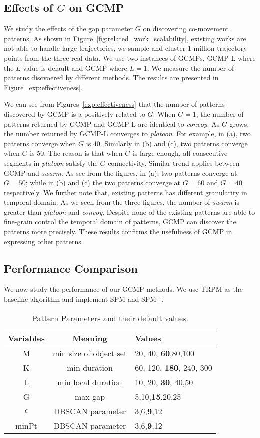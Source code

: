 \subsection{Effects of $G$ on GCMP}
We study the effects of the gap parameter $G$ on discovering co-movement patterns. 
As shown in Figure~\ref{fig:related_work_scalability},
existing works are not able to handle large trajectories, we sample and cluster $1$ million  
trajectory points from the three real data. We use two instances of GCMPs, GCMP-L where the
$L$ value is default and GCMP where $L = 1$.  We measure the number
of patterns discvoered by different methods. The results are presented in Figure~\ref{exp:effectiveness}.

We can see from Figures~\ref{exp:effectiveness} that the number of patterns
discovered by GCMP is a positively related to $G$. When $G =1$, the number
of patterns returned by GCMP and GCMP-L are identical to \emph{convoy}. As $G$ grows,
the number returned by GCMP-L converges to \emph{platoon}. For example, in (a), two
patterns converge when $G$ is $40$. Similarly in (b) and (c), two patterns converge
when $G$ is $50$. The reason is that when $G$ is large enough,
 all consecutive segments in \emph{platoon} satisfy the $G$-connectivity. Similar
 trend applies between GCMP and \emph{swarm}. As see from the figures, in (a), two
 patterns converge at $G=50$; while in (b) and (c) the two patterns converge
 at $G=60$ and $G=40$ respectively. We further
 note that, existing patterns has different granularity in temporal domain. As we seen
 from the three figures, the number of \emph{swarm} is greater than \emph{platoon} and
 \emph{convoy}. Despite none of the existing patterns are able to fine-grain control
 the temporal domain of patterns, GCMP can discover the patterns more precisely. 
 These results confirms the usefulness of GCMP in expressing other patterns.
  



\subsection{Performance Comparison}
We now study the performance of our GCMP methods. We use TRPM as
the baseline algorithm and implement SPM and SPM+.

\begin{table}
\begin{tabular}{c|c|l}
\hline 
\textbf{Variables} & \textbf{Meaning} & \textbf{Values} \\ 
\hline 
M & min size of object set &  20, 40, \textbf{60},80,100 \\ 
\hline 
K & min duration & 60, 120, \textbf{180}, 240, 300 \\ 
\hline 
L & min local duration & 10, 20, \textbf{30}, 40,50 \\ 
\hline 
G & max gap & 5,10,\textbf{15},20,25 \\ 
\hline 
$\epsilon$ & DBSCAN parameter & 3,6,\textbf{9},12 \\ 
\hline 
minPt & DBSCAN parameter & 3,6,\textbf{9},12 \\ 
\hline 
\end{tabular} 
\caption{Pattern Parameters and their default values.}
\end{table}


